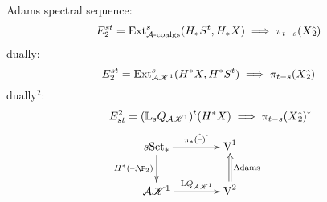 \documentclass{beamer}
\renewcommand{\calC}{\scrK}
\begin{document}
\begin{first section}
{Adams spectral sequence:
\[E_2^{st}=\operatorname{Ext}^s_{\mathcal{A}\textup{-coalgs}}(H_*S^t,H_*X)\implies \pi_{t-s}(X{_2\!\!\!\hat{\phantom{e}}})\]
 \pause dually:
\[E_2^{st}=\Ext^s_{\calA\calC^1}(H^*X,H^*S^t)\implies \pi_{t-s}(X{_2\!\!\!\hat{\phantom{e}}})\]
 \pause dually$^2$:
\[E^2_{st}=(\mathbb{L}_sQ_{\calA\calC^1})^t(H^*X)\implies \pi_{t-s}(X{_2\!\!\!\hat{\phantom{e}}})\,\check{ }\] \pause 
\[\xymatrix@!0@R=7mm@C=23mm{
s\textup{Set}_*\ar[r]^-{\pi_*(\hat{\rule{0pt}{2mm}\DASH})\check{\phantom{i}}}
&
\textup{V}^1&
\\
\\
\ar[uu];[]_-{H^*(\DASH;\F_2)}
\calA\calC^1
\ar[r]^-{\mathbb{L}Q_{\calA\calC^1}}
&
\textup{V}^2
\ar@{=>}[uu]_-{\textup{Adams}}
}\]
}
%
%

\end{first section}
\end{document}
